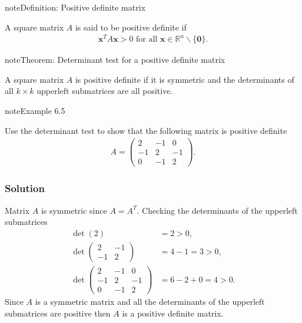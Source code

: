 \documentclass[letterpaper,10pt,english]{jupyterBook}
\begin{document}
\begin{sphinxadmonition}{note}{Definition: Positive definite matrix}

\sphinxAtStartPar
A square matrix \(A\) is said to be positive definite if
\begin{align*}
    \mathbf{x}^T A \mathbf{x} > 0 \text{ for all } \mathbf{x} \in \mathbb{R}^n \backslash \{\mathbf{0}\}.
\end{align*}\end{sphinxadmonition}

\begin{sphinxadmonition}{note}{Theorem: Determinant test for a positive definite matrix}

\sphinxAtStartPar
A square matrix \(A\) is positive definite if it is symmetric and the determinants of all \(k \times k\) upper\sphinxhyphen{}left sub\sphinxhyphen{}matrices are all positive.
\end{sphinxadmonition}

\begin{sphinxadmonition}{note}{Example 6.5}

\sphinxAtStartPar
Use the determinant test to show that the following matrix is positive definite
\begin{align*}
    A = \begin{pmatrix}
        2 & -1 & 0 \\
        -1 & 2 & -1 \\
        0 & -1 & 2
    \end{pmatrix}.
\end{align*}\subsubsection*{Solution}

\sphinxAtStartPar
Matrix \(A\) is symmetric since \(A=A^T\). Checking the determinants of the upper\sphinxhyphen{}left sub\sphinxhyphen{}matrices
\begin{align*}
    \det(2) &= 2 > 0, \\
    \det\begin{pmatrix} 2 & -1 \\ -1 & 2 \end{pmatrix} &= 4 - 1 = 3 > 0, \\
    \det\begin{pmatrix}
        2 & -1 & 0 \\
        -1 & 2 & -1 \\
        0 & -1 & 2
    \end{pmatrix}
    &= 6 - 2 + 0 = 4 > 0 .
\end{align*}
\sphinxAtStartPar
Since \(A\) is a symmetric matrix and all the determinants of the upper\sphinxhyphen{}left sub\sphinxhyphen{}matrices are positive then \(A\) is a positive definite matrix.
\end{sphinxadmonition}
\end{document}
